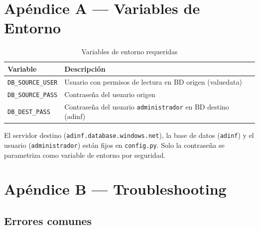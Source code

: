 \documentclass[12pt,a4paper,twoside]{report}
\begin{document}
\chapter{Ap\'endice A --- Variables de Entorno}

\begin{table}[H]
\centering
\caption{Variables de entorno requeridas}
\begin{tabularx}{\textwidth}{lX}
\toprule
\textbf{Variable} & \textbf{Descripci\'on} \\
\midrule
\texttt{DB\_SOURCE\_USER} & Usuario con permisos de lectura en BD origen (valuedata) \\
\texttt{DB\_SOURCE\_PASS} & Contrase\~na del usuario origen \\
\texttt{DB\_DEST\_PASS} & Contrase\~na del usuario \texttt{administrador} en BD destino (adinf) \\
\bottomrule
\end{tabularx}

\begin{infobox}
El servidor destino (\texttt{adinf.database.windows.net}), la base de datos (\texttt{adinf}) y el usuario (\texttt{administrador}) est\'an fijos en \texttt{config.py}. Solo la contrase\~na se parametriza como variable de entorno por seguridad.
\end{infobox}
\end{table}

\chapter{Ap\'endice B --- Troubleshooting}

\section{Errores comunes}
\end{document}
